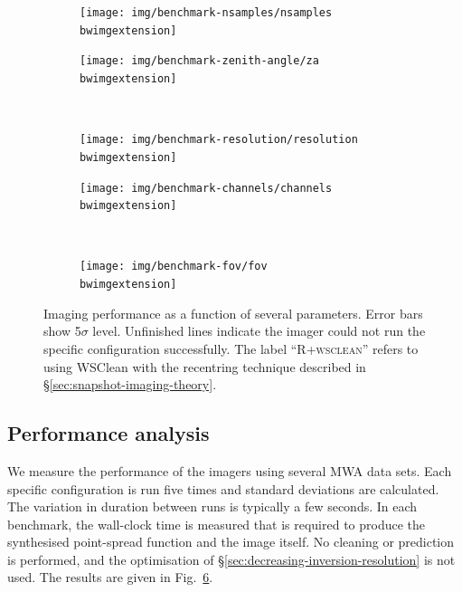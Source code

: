 \documentclass[useAMS,usenatbib]{mn2e}
\newcommand{\bwimgextension}{}
\begin{document}
\begin{figure}%
\begin{subfigure}{.5\linewidth}%
\texttt{[image: img/benchmark-nsamples/nsamples\\bwimgextension]}%
\caption{}\label{fig:timing-nsamples}%
\end{subfigure}%
\hspace{-.05\linewidth}\begin{subfigure}{.5\linewidth}%
\texttt{[image: img/benchmark-zenith-angle/za\\bwimgextension]}%
\caption{}\label{fig:timing-zenith-angle}%
\end{subfigure}\\
\begin{subfigure}{.5\linewidth}%
\texttt{[image: img/benchmark-resolution/resolution\\bwimgextension]}
\caption{}\label{fig:timing-resolution}%
\end{subfigure}%
\hspace{-.05\linewidth}\begin{subfigure}{.5\linewidth}%
\texttt{[image: img/benchmark-channels/channels\\bwimgextension]}
\caption{}\label{fig:timing-channels}%
\end{subfigure}\\
\begin{subfigure}{.5\linewidth}%
\texttt{[image: img/benchmark-fov/fov\\bwimgextension]}
\caption{}\label{fig:timing-fov}%
\end{subfigure}%
\caption{Imaging performance as a function of several parameters. Error bars show 5$\sigma$ level. Unfinished lines indicate the imager could not run the specific configuration successfully. The label ``R+\textsc{wsclean}'' refers to using WSClean with the recentring technique described in \S\ref{sec:snapshot-imaging-theory}.}\label{fig:timings}
\end{figure}

\subsection{Performance analysis}

We measure the performance of the imagers using several MWA data sets. Each specific configuration is run five times and standard deviations are calculated. The variation in duration between runs is typically a few seconds. In each benchmark, the wall-clock time is measured that is required to produce the synthesised point-spread function and the image itself. No cleaning or prediction is performed, and the optimisation of \S\ref{sec:decreasing-inversion-resolution} is not used. The results are given in Fig.~\ref{fig:timings}.
\end{document}
